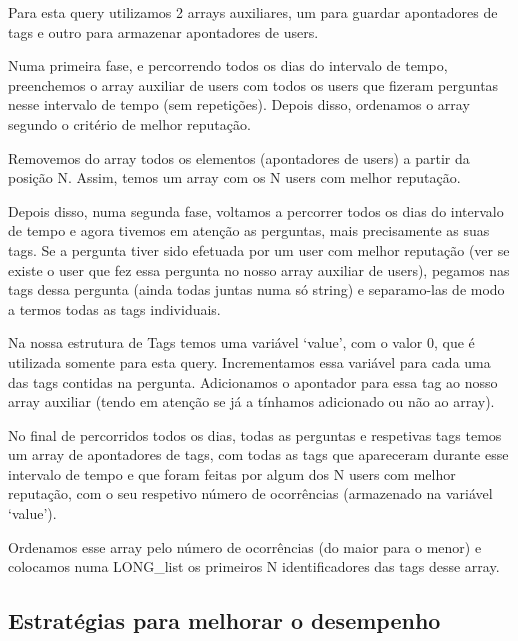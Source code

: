\documentclass[a4paper]{article}
\begin{document}
Para esta query utilizamos 2 arrays auxiliares, um para guardar apontadores de tags
e outro para armazenar apontadores de users.

Numa primeira fase, e percorrendo todos os dias do intervalo de tempo,
preenchemos o array auxiliar de users com todos os users que fizeram perguntas
nesse intervalo de tempo (sem repetições). Depois disso, ordenamos o array segundo
o critério de melhor reputação.

Removemos do array todos os elementos (apontadores de users) a partir da posição N.
Assim, temos um array com os N users com melhor reputação.

Depois disso, numa segunda fase, voltamos a percorrer todos os dias do intervalo
de tempo e agora tivemos em atenção as perguntas, mais precisamente as suas tags.
Se a pergunta tiver sido efetuada por um user com melhor reputação (ver se existe
o user que fez essa pergunta no nosso array auxiliar de users), pegamos nas tags
dessa pergunta (ainda todas juntas numa só string) e separamo-las de modo a termos
todas as tags individuais.

Na nossa estrutura de Tags temos uma variável \textsf{‘value’}, com o valor 0,
que é utilizada somente para esta query. Incrementamos essa variável para cada
uma das tags contidas na pergunta. Adicionamos o apontador para essa tag ao nosso
array auxiliar (tendo em atenção se já a tínhamos adicionado ou não ao array).

No final de percorridos todos os dias, todas as perguntas e respetivas tags
temos um array de apontadores de tags, com todas as tags que apareceram durante
esse intervalo de tempo e que foram feitas por algum dos N users com melhor reputação,
com o seu respetivo número de ocorrências (armazenado na variável \textsf{‘value’}).

Ordenamos esse array pelo número de ocorrências (do maior para o menor) e
colocamos numa LONG\_list os primeiros N identificadores das tags desse array.


\subsection{Estratégias para melhorar o desempenho}
\label{sec:desempenho}
\end{document}
